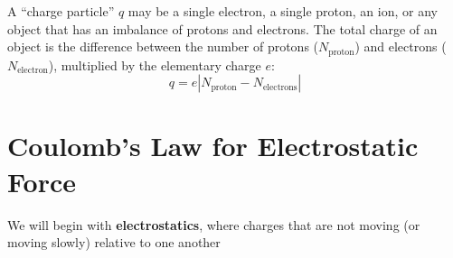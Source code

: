 A ``charge particle'' $q$ may be a single electron, a single proton, an ion, or
any object that has an imbalance of protons and electrons. The total charge of
an object is the difference between the number of protons ($N_\text{proton}$) and
electrons ($N_\text{electron}$), multiplied by the elementary charge $e$:
\begin{equation}
  q=e|N_\text{proton}-N_\text{electrons}|
\end{equation}



\section{Coulomb's Law for Electrostatic Force}

We will begin with \textbf{electrostatics}, where charges that are not moving
(or moving slowly) relative to one another

